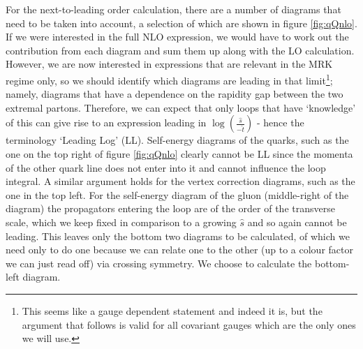 For the next-to-leading order calculation, there are a number of diagrams that need to be taken into account, a selection of which are shown in figure \ref{fig:qQnlo}. If we were interested in the full NLO expression, we would have to work out the contribution from each diagram and sum them up along with the LO calculation. However, we are now interested in expressions that are relevant in the MRK regime only, so we should identify which diagrams are leading in that limit\footnote{This seems like a gauge dependent statement and indeed it is, but the argument that follows is valid for all covariant gauges which are the only ones we will use.}; namely, diagrams that have a dependence on the rapidity gap between the two extremal partons. Therefore, we can expect that only loops that have `knowledge' of this can give rise to an expression leading in $\log(\frac{\hat{s}}{-\hat{t}})$ - hence the terminology `Leading Log' (LL). Self-energy diagrams of the quarks, such as the one on the top right of figure \ref{fig:qQnlo} clearly cannot be LL since the momenta of the other quark line does not enter into it and cannot influence the loop integral. A similar argument holds for the vertex correction diagrams, such as the one in the top left. For the self-energy diagram of the gluon (middle-right of the diagram) the propagators entering the loop are of the order of the transverse scale, which we keep fixed in comparison to a growing $\hat{s}$ and so again cannot be leading. This leaves only the bottom two diagrams to be calculated, of which we need only to do one because we can relate one to the other (up to a colour factor we can just read off) via crossing symmetry. We choose to calculate the bottom-left diagram.

